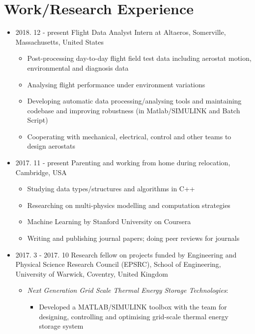 \documentclass[letterpaper]{article}
\begin{document}
\vspace{-12pt}
\section*{Work/Research Experience}
\vspace{-10pt}
\begin{itemize}
\item 2018. 12 - present \hspace{2pt} Flight Data Analyst Intern at Altaeros, Somerville, Massachusetts, United States
	\begin{itemize}
	\item Post-processing day-to-day flight field test data including aerostat motion, environmental and diagnosis data
	\item Analysing flight performance under environment variations
	\item Developing automatic data processing/analysing tools and maintaining codebase and improving robustness (in Matlab/SIMULINK and Batch Script)
	\item Cooperating with mechanical, electrical, control and other teams to design aerostats
	\end{itemize}
\item 2017. 11 - present \hspace{2pt} Parenting and working from home during relocation, Cambridge, USA
		\begin{itemize}
		\item Studying data types/structures and algorithms in C++
		\item Researching on multi-physics modelling and computation strategies
		\item Machine Learning by Stanford University on Coursera
		\item Writing and publishing journal papers; doing peer reviews for journals
		\end{itemize}		
\item 2017. 3 - 2017. 10  \hspace{2pt} Research fellow on projects funded by Engineering and Physical Science Research Council (EPSRC), School of Engineering, University of Warwick, Coventry, United Kingdom
		\begin{itemize}
		\item \textsl{	Next Generation Grid Scale Thermal Energy Storage Technologies}: 
					\begin{itemize}
					\item Developed a MATLAB/SIMULINK toolbox with the team for designing, controlling and optimising grid-scale thermal energy storage system%

\end{itemize}
\end{itemize}
\end{itemize}
\end{document}
